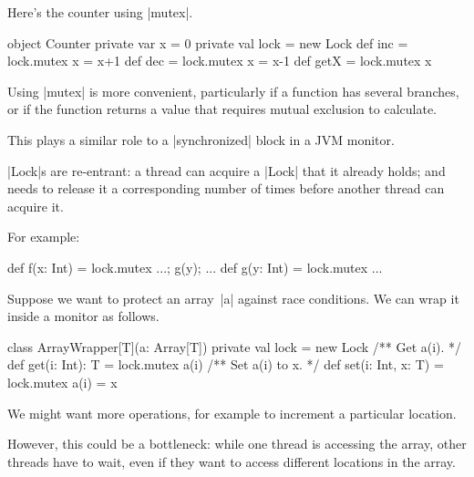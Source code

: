 \documentclass[notes,color]{sepslide0}
\begin{document}

\begin{slide}

Here's the counter using |mutex|.
%
\begin{scala}
object Counter{
  private var x = 0
  private val lock = new Lock
  def inc = lock.mutex{ x = x+1 }
  def dec = lock.mutex{ x = x-1 }
  def getX = lock.mutex{ x }
}
\end{scala}
%
Using |mutex| is more convenient, particularly if a function has several
branches, or if the function returns a value that requires mutual exclusion to
calculate. 

This plays a similar role to a |synchronized| block in a JVM monitor.
\end{slide}


\begin{slide}

|Lock|s are re-entrant: a thread can acquire a |Lock| that it already holds;
and needs to release it a corresponding number of times before another
thread can acquire it.

For example:
\begin{scala}
def f(x: Int) = lock.mutex{ ...; g(y); ... }
def g(y: Int) = lock.mutex{ ... }
\end{scala}
\end{slide}



\begin{slide}

Suppose we want to protect an array~|a| against race conditions.  We
can wrap it inside a monitor as follows.
%
\begin{scala}
class ArrayWrapper[T](a: Array[T]){
  private val lock = new Lock
  /** Get a(i). */
  def get(i: Int): T = lock.mutex{ a(i) }
  /** Set a(i) to x. */
  def set(i: Int, x: T) = lock.mutex{ a(i) = x }
}
\end{scala}
%
We might want more operations, for example to increment a particular
location. 

However, this could be a bottleneck: while one thread is accessing
the array, other threads have to wait, even if they want to access 
different locations in the array.
\end{slide}

\end{document}
